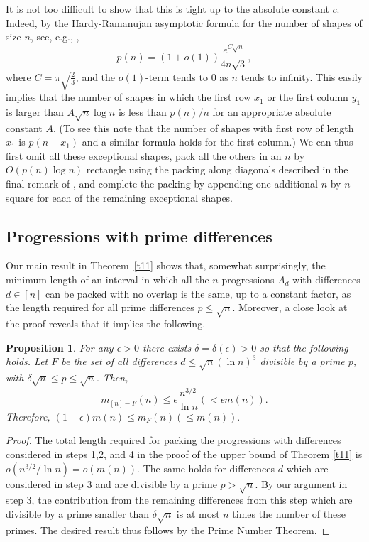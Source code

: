 \documentclass[12pt]{amsart}
\theoremstyle{plain}
\newtheorem{proposition}{Proposition}
\numberwithin{equation}{section}
\begin{document}
It is not too difficult to show that this is tight up to the absolute constant $c$.  Indeed,
by the Hardy-Ramanujan asymptotic formula for the number of shapes of size
$n$, see, e.g., \cite{An}, 
\begin{equation} 
	\label{e31}
	p(n) =(1+o(1)) \frac{e^{C\sqrt{n}}}{4n\sqrt{3}}, 
\end{equation}
where $C=\pi \sqrt{\frac{2}{3}}$, and the $o(1)$-term tends to $0$ as $n$ tends to infinity. This easily implies that the number of shapes in which the first row $x_1$ or the first column 
$y_1$ is larger than $A \sqrt n \log n$ is less than $p(n)/ n$ for an appropriate  absolute constant $A$. (To see this note that the number of shapes with first row
of length $x_1$ is $p(n-x_1)$ and a similar formula holds for the first column.)
We can thus first omit all these exceptional shapes, pack all the others in an $n$ by $O(p(n) \log n)$ rectangle using the packing along diagonals described in the final remark of \cite{ABS}, and complete the packing by appending one additional $n$ by $n$ square for each of the remaining exceptional shapes.

\subsection{Progressions with prime differences}
Our main result in Theorem~\ref{t11} shows that, somewhat surprisingly, the minimum length of an interval in which all the $n$ progressions $A_d$ with differences $d \in [n]$ can be packed with no overlap
is the same, up to a constant factor, as the length required for all prime differences $p \leqslant \sqrt n$. Moreover, a close look at the proof reveals that it implies the following.
\begin{proposition}
	\label{p31}
	For any $\epsilon>0$ there exists $\delta=\delta(\epsilon)>0$ so that the following holds. Let $F$ be the set of all differences $d\leqslant \sqrt{n}(\ln n)^3$ divisible by a prime $p$, with $\delta \sqrt n \leqslant p \leqslant \sqrt n$. Then,  
	$$
	m_{[n]-F}(n) \leqslant \epsilon \frac{n^{3/2}}{\ln n} (< \epsilon m(n)).
	$$
	Therefore, $(1-\epsilon) m(n) \leqslant m_F(n) (\leqslant m(n)).$
\end{proposition}
\begin{proof}
	The total length required for packing the progressions with differences considered in
	steps 1,2, and 4 in the proof of the upper bound of Theorem \ref{t11} is $o(n^{3/2}/\ln n)=o(m(n)).$
	The same holds for differences $d$ which are considered in step 3 and are divisible by a prime $p>\sqrt{n}$.
	By our argument in step 3, the contribution  from  the remaining differences from this step 
	which are
	divisible by a prime smaller than $\delta \sqrt n$ is at most $n$ times the number
	of these primes.
	The desired result thus follows by the Prime Number Theorem.  
\end{proof}
\end{document}
